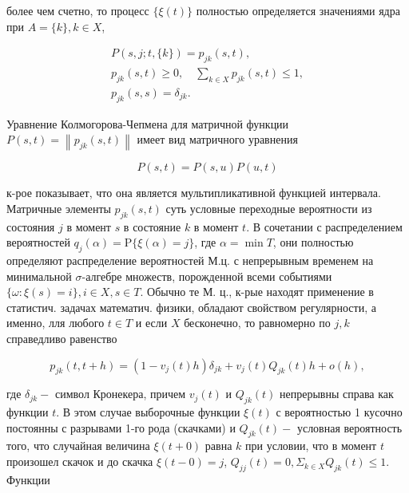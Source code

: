 \documentclass[10pt]{article}
\begin{document}
более чем счетно, то процесс $\{\xi(t)\}$ полностью определяется значениями ядра при $A=\{k\}, k \in X$,



\[

\begin{gathered}

P(s, j ; t,\{k\})=p_{j k}(s, t), \\

p_{j k}(s, t) \geqslant 0, \quad \sum_{k \in X} p_{j k}(s, t) \leqslant 1, \\

p_{j k}(s, s)=\delta_{j k} .

\end{gathered}

\]



Уравнение Колмогорова-Чепмена для матричной функции $P(s, t)=\left\|p_{j k}(s, t)\right\|$ имеет вид матричного уравнения



\[

P(s, t)=P(s, u) P(u, t)

\]



к-рое показывает, что она является мультипликативной функцией интервала. Матричные элементы $p_{j k}(s, t)$ суть условные переходные вероятности из состояния $j$ в момент $s$ в состояние $k$ в момент $t$. В сочетании с распределением вероятностей $q_{j}(\alpha)=\mathrm{P}\{\xi(\alpha)=j\}$, где $\alpha=\min T$, они полностью определяют распределение вероятностей М.ц. с непрерывным временем на минимальной $\sigma$-алгебре множеств, порожденной всеми событиями $\{\omega: \xi(s)=i\}, i \in X, s \in T$. Обычно те М. ц., к-рые находят применение в статистич. задачах математич. физики, обладают свойством регулярности, а именно, лля любого $t \in T$ и если $X$ бесконечно, то равномерно по $j, k$ справедливо равенство



\[

p_{j k}(t, t+h)=\left(1-v_{j}(t) h\right) \delta_{j k}+v_{j}(t) Q_{j k}(t) h+o(h),

\]



где $\delta_{j k}-$ символ Кронекера, причем $v_{j}(t)$ и $Q_{j k}(t)$ непрерывны справа как функции $t$. В этом случае выборочные функции $\xi(t)$ с вероятностью 1 кусочно постоянны с разрывами 1-го рода (скачками) и $Q_{j k}(t)-$ условная вероятность того, что случайная величина $\xi(t+0)$ равна $k$ при условии, что в момент $t$ произошел скачок и до скачка $\xi(t-0)=j$, $Q_{j j}(t)=0, \Sigma_{k \in X} Q_{j k}(t) \leqslant 1$. Функции
\end{document}
